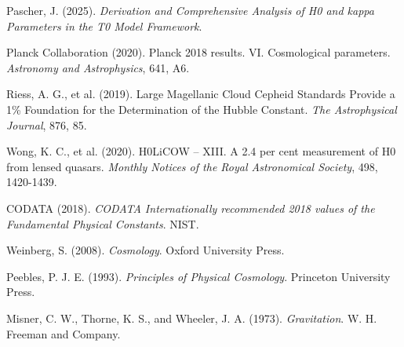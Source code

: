 \documentclass[12pt,a4paper]{article}
\begin{document}
	\begin{thebibliography}{9}
		
		Pascher, J. (2025). \textit{Derivation and Comprehensive Analysis of H0 and kappa Parameters in the T0 Model Framework}.
		
		Planck Collaboration (2020). Planck 2018 results. VI. Cosmological parameters. \textit{Astronomy and Astrophysics}, 641, A6.
		
		Riess, A. G., et al. (2019). Large Magellanic Cloud Cepheid Standards Provide a 1\% Foundation for the Determination of the Hubble Constant. \textit{The Astrophysical Journal}, 876, 85.
		
		Wong, K. C., et al. (2020). H0LiCOW -- XIII. A 2.4 per cent measurement of H0 from lensed quasars. \textit{Monthly Notices of the Royal Astronomical Society}, 498, 1420-1439.
		
		CODATA (2018). \textit{CODATA Internationally recommended 2018 values of the Fundamental Physical Constants}. NIST.
		
		Weinberg, S. (2008). \textit{Cosmology}. Oxford University Press.
		
		Peebles, P. J. E. (1993). \textit{Principles of Physical Cosmology}. Princeton University Press.
		
		Misner, C. W., Thorne, K. S., and Wheeler, J. A. (1973). \textit{Gravitation}. W. H. Freeman and Company.
		
	\end{thebibliography}
	
\end{document}
